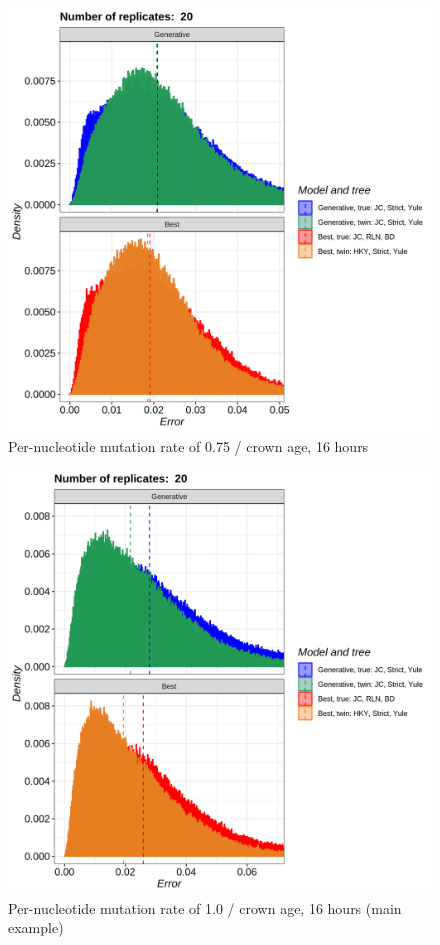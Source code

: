 \begin{figure}[H]
  \includegraphics[width=\textwidth]{pirouette_example_37/errors.png}
  \caption{Per-nucleotide mutation rate of 0.75 / crown age, 16 hours}
\end{figure}

\begin{figure}[H]
  \includegraphics[width=\textwidth]{pirouette_example_28/errors.png}
  \caption{Per-nucleotide mutation rate of 1.0 / crown age, 16 hours (main example)}
\end{figure}

